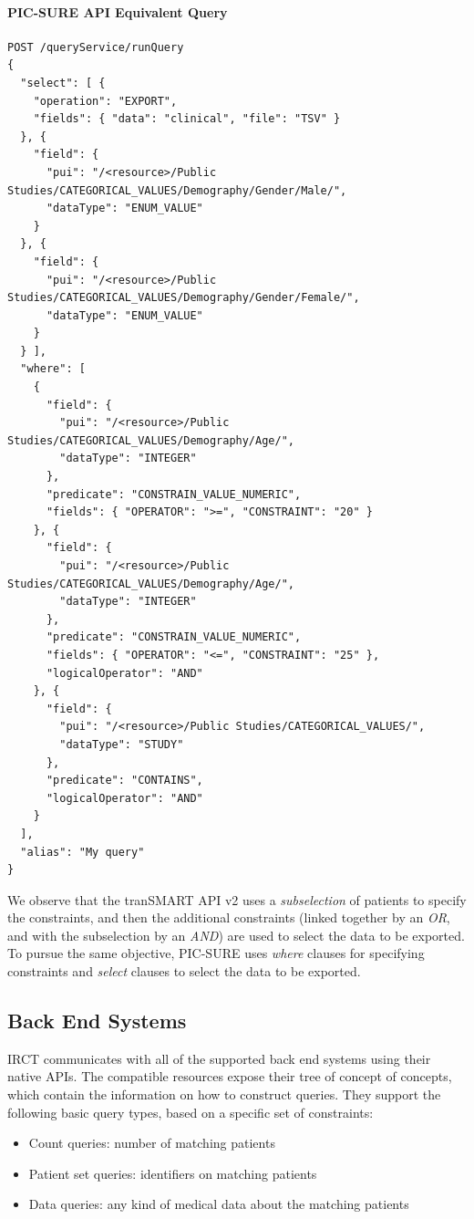 \paragraph*{PIC-SURE API Equivalent Query}
\begin{verbatim}
POST /queryService/runQuery
{
  "select": [ {
    "operation": "EXPORT",
    "fields": { "data": "clinical", "file": "TSV" }
  }, {
    "field": {
      "pui": "/<resource>/Public Studies/CATEGORICAL_VALUES/Demography/Gender/Male/",
      "dataType": "ENUM_VALUE"
    }
  }, {
    "field": {
      "pui": "/<resource>/Public Studies/CATEGORICAL_VALUES/Demography/Gender/Female/",
      "dataType": "ENUM_VALUE"
    }
  } ],
  "where": [
    {
      "field": {
        "pui": "/<resource>/Public Studies/CATEGORICAL_VALUES/Demography/Age/",
        "dataType": "INTEGER"
      },
      "predicate": "CONSTRAIN_VALUE_NUMERIC",
      "fields": { "OPERATOR": ">=", "CONSTRAINT": "20" }
    }, {
      "field": {
        "pui": "/<resource>/Public Studies/CATEGORICAL_VALUES/Demography/Age/",
        "dataType": "INTEGER"
      },
      "predicate": "CONSTRAIN_VALUE_NUMERIC",
      "fields": { "OPERATOR": "<=", "CONSTRAINT": "25" },
      "logicalOperator": "AND"
    }, {
      "field": {
        "pui": "/<resource>/Public Studies/CATEGORICAL_VALUES/",
        "dataType": "STUDY"
      },
      "predicate": "CONTAINS",
      "logicalOperator": "AND"
    } 
  ],
  "alias": "My query"
}
\end{verbatim}

We observe that the tranSMART API v2 uses a \emph{subselection} of patients to specify the constraints, and then the additional constraints (linked together by an \emph{OR}, and with the subselection by an \emph{AND}) are used to select the data to be exported.
To pursue the same objective, PIC-SURE uses \emph{where} clauses for specifying constraints and \emph{select} clauses to select the data to be exported.


\subsection{Back End Systems}

IRCT communicates with all of the supported back end systems using their native APIs.
The compatible resources expose their tree of concept of concepts, which contain the information on how to construct queries.
They support the following basic query types, based on a specific set of constraints:
\begin{itemize}
    \item Count queries: number of matching patients
    \item Patient set queries: identifiers on matching patients
    \item Data queries: any kind of medical data about the matching patients
\end{itemize}

